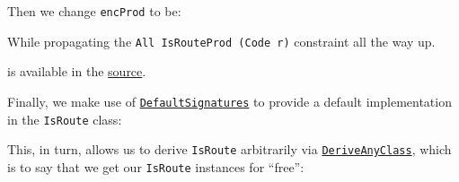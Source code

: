 {  Then we change \texttt{encProd} to be:

\begin{Shaded}
\begin{Highlighting}[]
\NormalTok{ (}\OtherTok{=\textgreater{}}  \OtherTok{{-}\textgreater{}} \NormalTok{ (} 
\OtherTok{=}
    
\end{Highlighting}
\end{Shaded}

  While propagating the \texttt{All\ IsRouteProd\ (Code\ r)} constraint
  all the way up.} is available in the
\href{https://github.com/srid/generics-sop-examples/blob/master/src/RouteEncoding.hs}{source}.

Finally, we make use of
\href{https://ghc.gitlab.haskell.org/ghc/doc/users_guide/exts/default_signatures.html}{\texttt{DefaultSignatures}}
to provide a default implementation in the \texttt{IsRoute} class:

\begin{Shaded}
\begin{Highlighting}[]
 
\OtherTok{{-}\textgreater{}} 
\NormalTok{    (} \NormalTok{ (}\OtherTok{=\textgreater{}}
\OtherTok{{-}\textgreater{}}
\OtherTok{=}
\end{Highlighting}
\end{Shaded}

This, in turn, allows us to derive \texttt{IsRoute} arbitrarily via
\href{https://ghc.gitlab.haskell.org/ghc/doc/users_guide/exts/deriving_strategies.html}{\texttt{DeriveAnyClass}},
which is to say that we get our \texttt{IsRoute} instances for ``free'':

\begin{Shaded}
\begin{Highlighting}[]
 
  \OtherTok{=} 
  \OperatorTok{|}  
  \NormalTok{, }\NormalTok{, }\NormalTok{)}
  \NormalTok{, }\NormalTok{, }\NormalTok{)}\OtherTok{\textasciigrave{}}
\end{Highlighting}
\end{Shaded}

